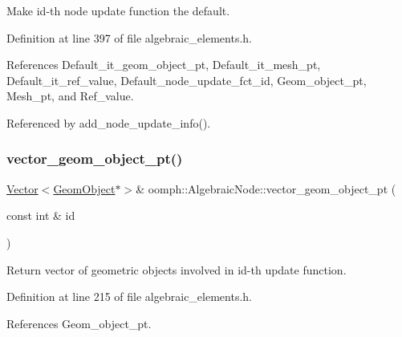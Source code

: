 Make id-\/th node update function the default. 



Definition at line 397 of file algebraic\+\_\+elements.\+h.



References Default\+\_\+it\+\_\+geom\+\_\+object\+\_\+pt, Default\+\_\+it\+\_\+mesh\+\_\+pt, Default\+\_\+it\+\_\+ref\+\_\+value, Default\+\_\+node\+\_\+update\+\_\+fct\+\_\+id, Geom\+\_\+object\+\_\+pt, Mesh\+\_\+pt, and Ref\+\_\+value.



Referenced by add\+\_\+node\+\_\+update\+\_\+info().

\mbox{\label{classoomph_1_1AlgebraicNode_aa82f9b47f4b7fb1cc49178c48c2873d3}} 
\subsubsection{\texorpdfstring{vector\+\_\+geom\+\_\+object\+\_\+pt()}{vector\_geom\_object\_pt()}\hspace{0.1cm}{\footnotesize\ttfamily [1/2]}}
{\footnotesize\ttfamily \hyperlink{classoomph_1_1Vector}{Vector}$<$\hyperlink{classoomph_1_1GeomObject}{Geom\+Object}$\ast$$>$\& oomph\+::\+Algebraic\+Node\+::vector\+\_\+geom\+\_\+object\+\_\+pt (\begin{DoxyParamCaption}\item[{const int \&}]{id }\end{DoxyParamCaption})\hspace{0.3cm}{\ttfamily [inline]}}



Return vector of geometric objects involved in id-\/th update function. 



Definition at line 215 of file algebraic\+\_\+elements.\+h.



References Geom\+\_\+object\+\_\+pt.



